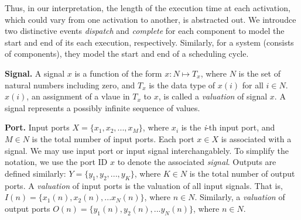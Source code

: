Thus, in our interpretation, the length of the execution time at each activation, which could vary from one activation to another, is abstracted out. We introudce two distinctive events \emph{dispatch} and \emph{complete} for each component to model the start and end of its each execution, respectively. Similarly, for a system (consists of components), they model the start and end of a scheduling cycle.

{\bf Signal.}
A signal $x$ is a function of the form $x: N \mapsto T_x$, where $N$ is the set of natural numbers including zero, and $T_x$ is the data type of $x(i)$ for all $i \in N$.
$x(i)$, an assignment of a vlaue in $T_x$ to $x$, is called a \emph{valuation} of signal $x$. A signal represents a possibly infinite sequence of values.

{\bf Port.}
Input ports $X = \{x_1, x_2, ..., x_M\}$, where $x_i$ is the \emph{i}-th input port, and $M\in N$ is the total number of input ports. Each port $x \in X$ is associated with a signal. We may use input port or input signal interchangablely. To simplify the notation, we use the port ID $x$ to denote the associated \emph{signal}. Outputs are defined similarly: $Y = \{y_1, y_2, ..., y_K\}$, where $K\in N$ is the total number of output ports.  
A \emph{valuation} of input ports is the valuation of all input signals. That is, $I(n) = \{x_1(n), x_2(n), ... x_N(n)\}$, where $n \in N$. Similarly, a \emph{valuation} of output ports $O(n) = \{y_1(n), y_2(n), ... y_N(n)\}$, where $n \in N$. 

